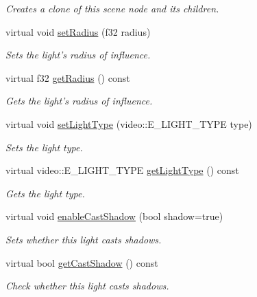 \begin{DoxyCompactItemize}
\begin{DoxyCompactList}\small\item\em Creates a clone of this scene node and its children. \end{DoxyCompactList}\item 
virtual void \hyperlink{classirr_1_1scene_1_1_c_light_scene_node_a2fdbd752ad33849481a29359119ae03b}{set\-Radius} (f32 radius)
\begin{DoxyCompactList}\small\item\em Sets the light's radius of influence. \end{DoxyCompactList}\item 
virtual f32 \hyperlink{classirr_1_1scene_1_1_c_light_scene_node_a30e57159469f7ed2bf34c4e88472291e}{get\-Radius} () const 
\begin{DoxyCompactList}\small\item\em Gets the light's radius of influence. \end{DoxyCompactList}\item 
virtual void \hyperlink{classirr_1_1scene_1_1_c_light_scene_node_a3789f111cd18979074438cfccccce0cc}{set\-Light\-Type} (video\-::\-E\-\_\-\-L\-I\-G\-H\-T\-\_\-\-T\-Y\-P\-E type)
\begin{DoxyCompactList}\small\item\em Sets the light type. \end{DoxyCompactList}\item 
virtual video\-::\-E\-\_\-\-L\-I\-G\-H\-T\-\_\-\-T\-Y\-P\-E \hyperlink{classirr_1_1scene_1_1_c_light_scene_node_a3ff2998d9cbbfa065d9b142cd3353e3f}{get\-Light\-Type} () const 
\begin{DoxyCompactList}\small\item\em Gets the light type. \end{DoxyCompactList}\item 
virtual void \hyperlink{classirr_1_1scene_1_1_c_light_scene_node_a5ee83bca9877c8294cf8486c6de8c74d}{enable\-Cast\-Shadow} (bool shadow=true)
\begin{DoxyCompactList}\small\item\em Sets whether this light casts shadows. \end{DoxyCompactList}\item 
virtual bool \hyperlink{classirr_1_1scene_1_1_c_light_scene_node_afa179c0c686e40e30b9af7408437dfd4}{get\-Cast\-Shadow} () const 
\begin{DoxyCompactList}\small\item\em Check whether this light casts shadows. \end{DoxyCompactList}\end{DoxyCompactItemize}


